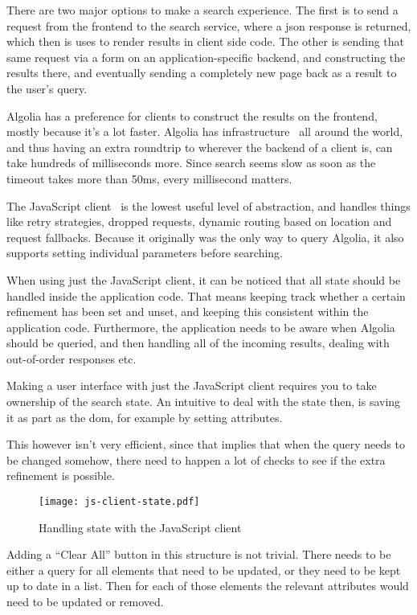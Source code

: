 There are two major options to make a search experience. The first is to send a request from the frontend to the search service, where a \acrshort{json} response is returned, which then is uses to render results in client side code. The other is sending that same request via a form on an application-specific backend, and constructing the results there, and eventually sending a completely new page back as a result to the user's query.

Algolia has a preference for clients to construct the results on the frontend, mostly because it's a lot faster. Algolia has infrastructure~\cite{algolia-infra} all around the world, and thus having an extra roundtrip to wherever the backend of a client is, can take hundreds of milliseconds more. Since search seems slow as soon as the timeout takes more than 50ms, every millisecond matters.

The JavaScript client~\cite{algolia-js-client} is the lowest useful level of abstraction, and handles things like retry strategies, dropped requests, dynamic routing based on location and request fallbacks. Because it originally was the only way to query Algolia, it also supports setting individual parameters before searching.

When using just the JavaScript client, it can be noticed that all state should be handled inside the application code. That means keeping track whether a certain refinement has been set and unset, and keeping this consistent within the application code. Furthermore, the application needs to be aware when Algolia should be queried, and then handling all of the incoming results, dealing with out-of-order responses etc.

Making a user interface with just the JavaScript client requires you to take ownership of the search state. An intuitive to deal with the state then, is saving it as part as the \acrshort{dom}, for example by setting attributes.

This however isn't very efficient, since that implies that when the query needs to be changed somehow, there need to happen a lot of checks to see if the extra refinement is possible.

\begin{figure}[H]
  \centering
  \texttt{[image: js-client-state.pdf]}
  \caption{Handling state with the JavaScript client}
  \label{figure:js-client-state}
\end{figure}

Adding a ``Clear All'' button in this structure is not trivial. There needs to be either a query for all elements that need to be updated, or they need to be kept up to date in a list. Then for each of those elements the relevant attributes would need to be updated or removed.

